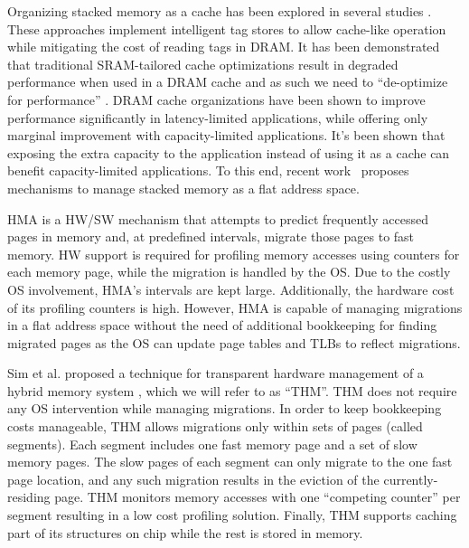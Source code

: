 Organizing stacked memory as a cache has been explored in several studies \cite{qureshi-micro2012,BEAR,BIMODAL,citadel,tagless-dram-cache,UNISON}. These approaches implement intelligent tag stores to allow cache-like operation while
 mitigating the cost of reading tags in DRAM. It has been demonstrated that traditional SRAM-tailored cache optimizations result in degraded performance when used in a DRAM cache and as such we need to ``de-optimize for performance'' \cite{qureshi-micro2012}.  DRAM cache organizations have been shown to improve performance significantly in latency-limited applications, while offering only marginal improvement with capacity-limited applications. It's been shown that exposing the extra capacity to the application instead of using it as a cache can benefit capacity-limited applications. To this end, recent work~\cite{meswani-HPCA21,sim-micro2014,cameo} proposes mechanisms to manage stacked memory as a flat address space. 


HMA \cite{meswani-HPCA21} is a HW/SW mechanism that attempts to predict frequently accessed pages in memory and, at predefined intervals, migrate those pages to fast memory. HW support is required for profiling memory accesses using counters for each memory page, while the migration is handled by the OS. Due to the costly OS involvement, HMA's intervals are kept large.  Additionally, 
the hardware cost of its profiling counters is high. However, HMA is capable of managing migrations in a flat address space without the need of additional bookkeeping for finding migrated pages as the OS can update page tables and TLBs to reflect migrations.

Sim et al. proposed a technique for transparent hardware management of a hybrid memory system \cite{sim-micro2014}, which we will refer to as ``THM''.
THM does not require any OS intervention while managing migrations. In order to keep bookkeeping costs manageable, THM allows migrations only within sets of pages (called segments). Each segment includes one fast memory page and a set of slow memory pages. The slow pages of each segment can only migrate to the one fast page location, and any such migration results in the eviction of the currently-residing page. THM monitors memory accesses with one ``competing counter'' per segment resulting in a low cost profiling solution. Finally, THM supports caching part of its structures on chip while the rest is stored in memory.

